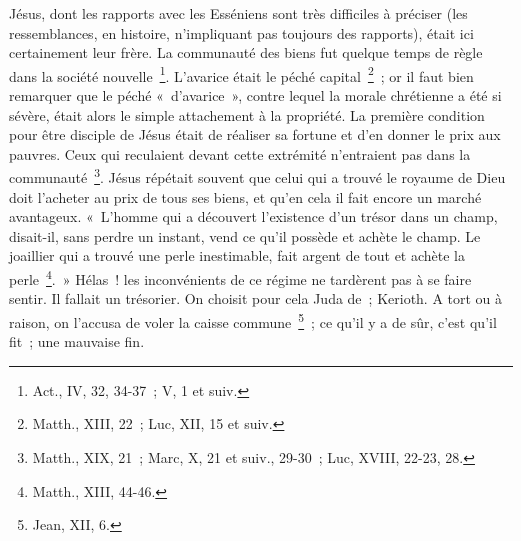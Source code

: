 \documentclass[french,twoside]{book} %
\begin{document}
Jésus, dont les rapports avec les Esséniens sont très difficiles à préciser (les ressemblances, en histoire, n’impliquant pas toujours des rapports), était ici certainement leur frère. La communauté des biens fut quelque temps de règle dans la société nouvelle \footnote{Act., IV, 32, 34-37 ; V, 1 et suiv.}. L’avarice était le péché capital \footnote{Matth., XIII, 22 ; Luc, XII, 15 et suiv.} ; or il faut bien remarquer que le péché « d’avarice », contre lequel la morale chrétienne a été si sévère, était alors le simple attachement à la propriété. La première condition pour être disciple de Jésus était de réaliser sa fortune et d’en donner le prix aux pauvres. Ceux qui reculaient devant cette extrémité n’entraient pas dans la communauté \footnote{Matth., XIX, 21 ; Marc, X, 21 et suiv., 29-30 ; Luc, XVIII, 22-23, 28.}. Jésus répétait souvent que celui qui a trouvé le royaume de Dieu doit l’acheter au prix de tous ses biens, et qu’en cela il fait encore un marché avantageux. « L’homme qui a découvert l’existence d’un trésor dans un champ, disait-il, sans perdre un instant, vend ce qu’il possède et achète le champ. Le joaillier qui a trouvé une perle inestimable, fait argent de tout et achète la perle \footnote{Matth., XIII, 44-46.}. » Hélas ! les inconvénients de ce régime ne tardèrent pas à se faire sentir. Il fallait un trésorier. On choisit pour cela Juda de ; Kerioth. A tort ou à raison, on l’accusa de voler la caisse commune \footnote{Jean, XII, 6.} ; ce qu’il y a de sûr, c’est qu’il fit ; une mauvaise fin.\par
\end{document}
